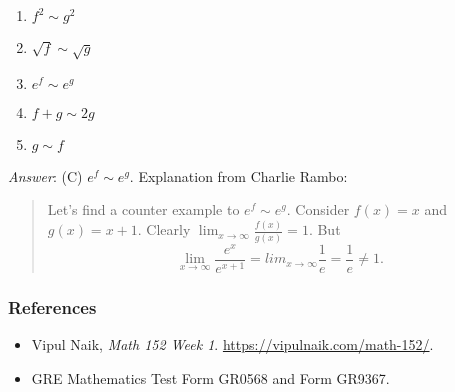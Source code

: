 \begin{itemize}
  \begin{enumerate}
  \def\labelenumi{(\Alph{enumi})}
  \tightlist
  \item
    \(f^2 \sim g^2\)
  \item
    \(\sqrt{f} \sim \sqrt{g}\)
  \item
    \(e^f \sim e^g\)
  \item
    \(f + g \sim 2g\)
  \item
    \(g \sim f\)
  \end{enumerate}

  \emph{Answer}: (C) \(e^f \sim e^g\). Explanation from Charlie Rambo:

  \begin{quote}
  Let's find a counter example to \(e^f \sim e^g\). Consider
  \(f(x) = x\) and \(g(x) = x+1\). Clearly
  \(\lim_{x\to \infty} \frac{f(x)}{g(x)} = 1.\) But
  \[\lim_{x\to\infty}\frac{e^x}{e^{x+1}} = lim_{x\to\infty}\frac1{e} = \frac1{e} \neq 1.\]
  \end{quote}
\end{itemize}

\hypertarget{references}{%
\subsubsection{References}\label{references}}

\begin{itemize}
\tightlist
\item
  Vipul Naik, \emph{Math 152 Week 1}.
  \url{https://vipulnaik.com/math-152/}.
\item
  GRE Mathematics Test Form GR0568 and Form GR9367.
\end{itemize}
